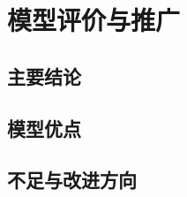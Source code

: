 \chapter[\hspace{0pt}模型评价与推广]{{\heiti{}\hspace{0pt}模型评价与推广}}\label{chapter4: 模型评价与推广}
\removelofgap
\removelotgap

\section[\hspace{-2pt}主要结论]{{\heiti{} \hspace{-8pt}主要结论}}\label{section5: 主要结论}

\section[\hspace{-2pt}模型优点]{{\heiti{} \hspace{-8pt}模型优点}}\label{section5: 模型优点}

\section[\hspace{-2pt}不足与改进方向]{{\heiti{} \hspace{-8pt}不足与改进方向}}\label{section5: 不足与改进方向}
